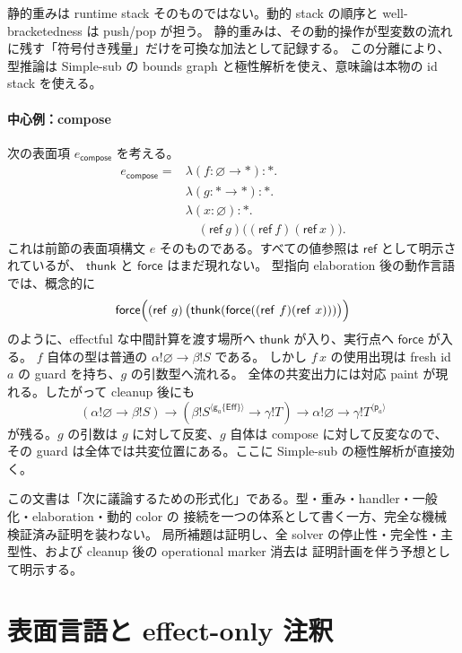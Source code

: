 \documentclass[uplatex,dvipdfmx,a4paper,11pt]{jsarticle}
\theoremstyle{jpplain}
\newcommand{\Eff}{\mathsf{Eff}}
\newcommand{\eff}{\mathbin{!}}
\newcommand{\emptyrow}{\varnothing}
\newcommand{\starann}{\ast}
\newcommand{\gatom}[2]{\mathsf g_{#1}\!\{#2\}}
\newcommand{\patom}[1]{\mathsf p_{#1}}
\newcommand{\wocc}[2]{#1^{\langle #2\rangle}}
\newcommand{\thunk}{\mathsf{thunk}}
\newcommand{\force}{\mathsf{force}}
\begin{document}
\begin{intuition}
静的重みは runtime stack そのものではない。動的 stack の順序と well-bracketedness は push/pop が担う。
静的重みは、その動的操作が型変数の流れに残す「符号付き残量」だけを可換な加法として記録する。
この分離により、型推論は Simple-sub の bounds graph と極性解析を使え、意味論は本物の id stack を使える。
\end{intuition}

\paragraph{中心例：compose}
次の表面項 \(e_{\mathsf{compose}}\) を考える。
\[
\begin{aligned}
e_{\mathsf{compose}}
  ={}& \lambda(f:\emptyrow\to\starann):\starann.\\
     & \lambda(g:\starann\to\starann):\starann.\\
     & \lambda(x:\emptyrow):\starann.\\
     &\quad (\mathsf{ref}\ g)\bigl((\mathsf{ref}\ f)(\mathsf{ref}\ x)\bigr).
\end{aligned}
\]
これは前節の表面項構文 \(e\) そのものである。すべての値参照は \(\mathsf{ref}\) として明示されているが、
\(\thunk\) と \(\force\) はまだ現れない。
型指向 elaboration 後の動作言語では、概念的に
\[
  \force\Bigl((\mathsf{ref}\ g)\,
    \bigl(\thunk(\force((\mathsf{ref}\ f)(\mathsf{ref}\ x)))\bigr)\Bigr)
\]
のように、effectful な中間計算を渡す場所へ \(\thunk\) が入り、実行点へ \(\force\) が入る。
$f$ 自体の型は普通の $\alpha\eff\emptyrow\to\beta\eff S$ である。
しかし $f\,x$ の使用出現は fresh id $a$ の guard を持ち、$g$ の引数型へ流れる。
全体の共変出力には対応 paint が現れる。したがって cleanup 後にも
\[
 (\alpha\eff\emptyrow\to\beta\eff S)
 \to
 (\beta\eff\wocc S{\gatom a\Eff}\to\gamma\eff T)
 \to
 \alpha\eff\emptyrow\to\gamma\eff\wocc T{\patom a}
\]
が残る。$g$ の引数は $g$ に対して反変、$g$ 自体は compose に対して反変なので、
その guard は全体では共変位置にある。ここに Simple-sub の極性解析が直接効く。

\begin{statusbox}
この文書は「次に議論するための形式化」である。型・重み・handler・一般化・elaboration・動的 color の
接続を一つの体系として書く一方、完全な機械検証済み証明を装わない。
局所補題は証明し、全 solver の停止性・完全性・主型性、および cleanup 後の operational marker 消去は
証明計画を伴う予想として明示する。
\end{statusbox}

\section{表面言語と effect-only 注釈}
\end{document}
